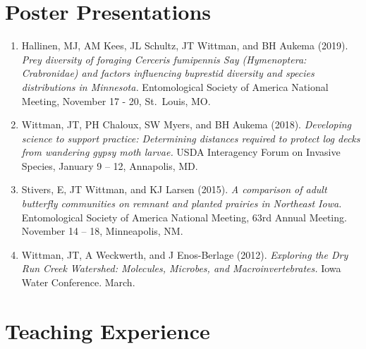 \documentclass[11pt, a4paper]{awesome-cv}
\providecommand{\tightlist}{%
	\setlength{\itemsep}{0pt}\setlength{\parskip}{0pt}}
\begin{document}
\hypertarget{poster-presentations}{%
\section{Poster Presentations}\label{poster-presentations}}

\begin{enumerate}
\def\labelenumi{\arabic{enumi}.}
\tightlist
\item
  Hallinen, MJ, AM Kees, JL Schultz, JT Wittman, and BH Aukema (2019). \emph{Prey diversity of foraging Cerceris fumipennis Say (Hymenoptera: Crabronidae) and factors influencing buprestid diversity and species distributions in Minnesota.} Entomological Society of America National Meeting, November 17 - 20, St.~Louis, MO.
\item
  Wittman, JT, PH Chaloux, SW Myers, and BH Aukema (2018). \emph{Developing science to support practice: Determining distances required to protect log decks from wandering gypsy moth larvae.} USDA Interagency Forum on Invasive Species, January 9 -- 12, Annapolis, MD.
\item
  Stivers, E, JT Wittman, and KJ Larsen (2015). \emph{A comparison of adult butterfly communities on remnant and planted prairies in Northeast Iowa.} Entomological Society of America National Meeting, 63rd Annual Meeting. November 14 -- 18, Minneapolis, NM.
\item
  Wittman, JT, A Weckwerth, and J Enos-Berlage (2012). \emph{Exploring the Dry Run Creek Watershed: Molecules, Microbes, and Macroinvertebrates.} Iowa Water Conference. March.
\end{enumerate}

\hypertarget{teaching-experience}{%
\section{Teaching Experience}\label{teaching-experience}}
\end{document}
